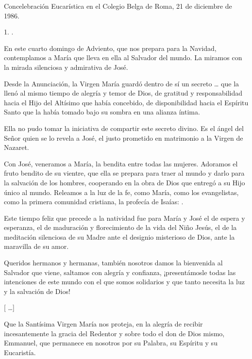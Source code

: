 \begin{body}
	Concelebración Eucarística en el Colegio Belga de Roma, 21 de diciembre de 1986.

	\begin{body}
		1. .

		En este cuarto domingo de Adviento, que nos prepara para la Navidad, contemplamos a María que lleva en ella al Salvador del mundo. La miramos con la mirada silenciosa y admirativa de José.

		Desde la Anunciación, la Virgen María guardó dentro de sí un secreto \ldots{} que la llenó al mismo tiempo de alegría y temor de Dios, de gratitud y responsabilidad hacia el Hijo del Altísimo que había concebido, de disponibilidad hacia el Espíritu Santo que la había tomado bajo su sombra en una alianza íntima.

		Ella no pudo tomar la iniciativa de compartir este secreto divino. Es el ángel del Señor quien se lo revela a José, el justo prometido en matrimonio a la Virgen de Nazaret.

		Con José, veneramos a María, la bendita entre todas las mujeres. Adoramos el fruto bendito de su vientre, que ella se prepara para traer al mundo y darlo para la salvación de los hombres, cooperando en la obra de Dios que entregó a su Hijo único al mundo. Releamos a la luz de la fe, como María, como los evangelistas, como la primera comunidad cristiana, la profecía de Isaías: .

		Este tiempo feliz que precede a la natividad fue para María y José el de espera y esperanza, el de maduración y florecimiento de la vida del Niño Jesús, el de la meditación silenciosa de su Madre ante el designio misterioso de Dios, ante la maravilla de su amor.

		Queridos hermanos y hermanas, también nosotros damos la bienvenida al Salvador que viene, saltamos con alegría y confianza, ¡presentámosle todas las intenciones de este mundo con el que somos solidarios y que tanto necesita la luz y la salvación de Dios!

		{[} \ldots{}{]}

		Que la Santísima Virgen María nos proteja, en la alegría de recibir incesantemente la gracia del Redentor y sobre todo el don de Dios mismo, Emmanuel, que permanece en nosotros por su Palabra, su Espíritu y su Eucaristía.
	\end{body}


\end{body}
